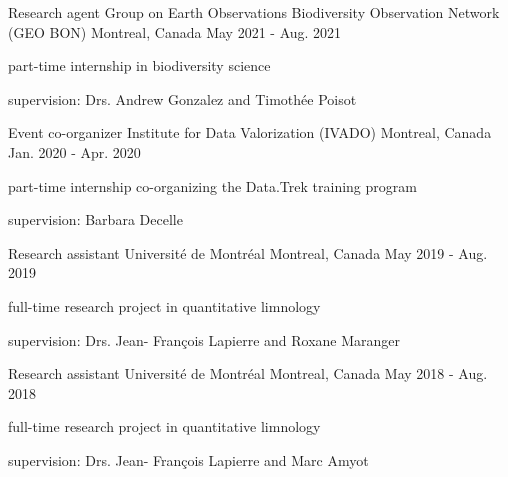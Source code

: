 
\begin{cventries}

  \cventry
    {Research agent} %
    {Group on Earth Observations Biodiversity Observation Network (GEO BON)} %
    {Montreal, Canada} %
    {May 2021 - Aug. 2021} %
    {
      \begin{cvitems} %
        \item {part-time internship in biodiversity science}
        \item {supervision: Drs. Andrew Gonzalez and Timothée Poisot}
      \end{cvitems}
    }

  \cventry
    {Event co-organizer} %
    {Institute for Data Valorization (IVADO)} %
    {Montreal, Canada} %
    {Jan. 2020 - Apr. 2020} %
    {
      \begin{cvitems} %
        \item {part-time internship co-organizing the Data.Trek training program}
        \item {supervision: Barbara Decelle}
      \end{cvitems}
    }

  \cventry
    {Research assistant} %
    {Université de Montréal} %
    {Montreal, Canada} %
    {May 2019 - Aug. 2019} %
    {
      \begin{cvitems} %
        \item {full-time research project in quantitative limnology}
        \item {supervision: Drs. Jean- François Lapierre and Roxane Maranger}
      \end{cvitems}
    }
    
  \cventry
    {Research assistant} %
    {Université de Montréal} %
    {Montreal, Canada} %
    {May 2018 - Aug. 2018} %
    {
      \begin{cvitems} %
        \item {full-time research project in quantitative limnology}
        \item {supervision: Drs. Jean- François Lapierre and Marc Amyot}
      \end{cvitems}
    }


\end{cventries}
